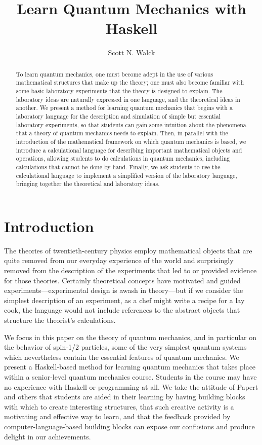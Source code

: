 \documentclass{eptcs}
\title{Learn Quantum Mechanics with Haskell}
\author{Scott N. Walck
\institute{Department of Physics\\
  Lebanon Valley College\\
  Annville, Pennsylvania, USA}
\email{walck@lvc.edu}
}
\begin{document}
\maketitle

\begin{abstract}
To learn quantum mechanics, one must become adept in the use
of various mathematical structures that make up the theory;
one must also become
familiar with some basic laboratory experiments that the theory is designed
to explain.
The laboratory ideas are naturally expressed in one language,
and the theoretical ideas in another.
We present a method for learning quantum mechanics that
begins with a laboratory language for the description and
simulation of simple but essential laboratory experiments,
so that students can gain some intuition about the phenomena that a theory
of quantum mechanics needs to explain.
Then, in parallel with the introduction of the mathematical
framework on which quantum mechanics is based,
we introduce a calculational language for describing
important mathematical objects and operations,
allowing students to do calculations in quantum mechanics, including
calculations that cannot be done by hand.
Finally, we ask students to use the calculational language
to implement a simplified version of the laboratory language,
bringing together the theoretical and laboratory ideas.
\end{abstract}

\section{Introduction}

The theories of twentieth-century physics employ mathematical objects
that are quite removed from our everyday experience of the world
and surprisingly removed from the description of the experiments
that led to or provided evidence for those theories.
Certainly theoretical concepts have motivated and guided
experiments---experimental design is awash in theory---but
if we consider the simplest description of an experiment,
as a chef might write a recipe for a lay cook, the language
would not include references to the abstract
objects that structure the theorist's calculations.

We focus in this paper on the theory of quantum mechanics,
and in particular on the behavior of spin-1/2 particles,
some of the very simplest quantum systems which nevertheless
contain the essential features of quantum mechanics.
We present a Haskell-based method for learning quantum mechanics that takes
place within a senior-level quantum mechanics course.
Students in the course may have no experience with Haskell
or programming at all.
We take the attitude of Papert\cite{papert}
and others\cite{sicm,sussmanFDG,alegreTFPIE2015,walck2014}
that students are aided in their learning by having
building blocks with which to create interesting structures,
that such creative activity is a motivating and effective
way to learn, and that the feedback provided by
computer-language-based building blocks can expose our
confusions and produce delight in our achievements.
\end{document}
